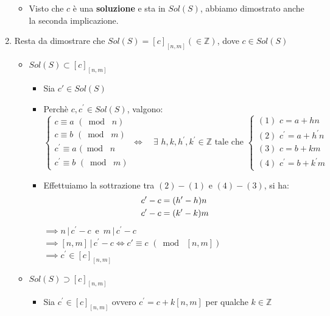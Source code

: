 \documentclass[10pt]{article}
\begin{document}
\begin{enumerate}
\begin{itemize}
\item
Visto che $c$ è una \textbf{soluzione} e sta in $Sol(S)$, abbiamo dimostrato anche la seconda implicazione.
\end{itemize}
\item
Resta da dimostrare che $Sol(S) = \left[c\right]_{\left[n,m\right]} (\in \mathbb{Z})$, dove $c \in Sol(S)$
\begin{itemize}
\item
$Sol(S) \subset \left[c\right]_{\left[n,m\right]}$
\begin{itemize}
\item
Sia $c' \in Sol(S)$
\item
Perchè $c, c^\prime \in Sol(S)$, valgono:
$\begin{cases} c \equiv a \,\, (\bmod \,\,n) \\ c \equiv b \,\, (\bmod \,\, m) \\ c^\prime \equiv a \,\, (\bmod \,\,n \\ c^\prime \equiv b \,\, (\bmod \,\, m) \end{cases} \Longleftrightarrow \quad \exists \,\, h,k,h^\prime,k^\prime \in \mathbb{Z} \textrm{ tale che } \begin{cases}  (1)\,\,c = a + hn \\ (2)\,\,c^\prime = a + h^\prime n \\ (3)\,\,c = b + km \\ (4)\,\,c^\prime = b + k^\prime m \end{cases}$
\smallskip 
\item
Effettuiamo la sottrazione tra $(2) - (1)$ e $(4) - (3)$, si ha:
\begin{equation}
\begin{split}
c' - c &= (h^\prime - h)n \\
c' - c &= (k^\prime - k)m
\notag
\end{split}
\end{equation}
$\!\!\implies n\,|\, c^\prime  - c\,$ e $\,m\,|\, c^\prime - c$ \\ 
$\implies \left[n,m\right] \,|\, c^\prime - c \Longleftrightarrow c ' \equiv c \,\, (\bmod \,\, \left[n,m\right])$ \\
$\implies c^\prime \in \left[c\right]_{\left[n,m\right]}$
\smallskip
\end{itemize}
\item
$Sol(S) \supset \left[c\right]_{\left[n,m\right]}$
\begin{itemize}
\item
Sia $c^\prime \in \left[c\right]_{\left[n,m\right]}$ ovvero $c^\prime = c + k\left[n,m\right]$ per qualche $k \in \mathbb{Z}$

\end{itemize}
\end{itemize}
\end{enumerate}
\end{document}
